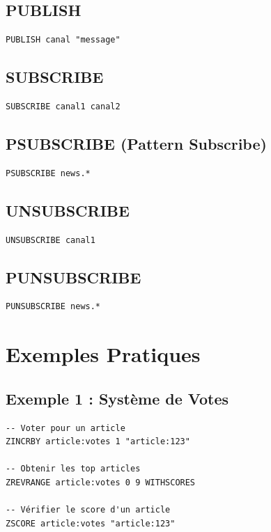 \documentclass[11pt,a4paper]{article}
\begin{document}
\subsection{PUBLISH}

\begin{lstlisting}
PUBLISH canal "message"
\end{lstlisting}

\subsection{SUBSCRIBE}

\begin{lstlisting}
SUBSCRIBE canal1 canal2
\end{lstlisting}

\subsection{PSUBSCRIBE (Pattern Subscribe)}

\begin{lstlisting}
PSUBSCRIBE news.*
\end{lstlisting}

\subsection{UNSUBSCRIBE}

\begin{lstlisting}
UNSUBSCRIBE canal1
\end{lstlisting}

\subsection{PUNSUBSCRIBE}

\begin{lstlisting}
PUNSUBSCRIBE news.*
\end{lstlisting}

\newpage

\section{Exemples Pratiques}

\subsection{Exemple 1 : Système de Votes}

\begin{lstlisting}
-- Voter pour un article
ZINCRBY article:votes 1 "article:123"

-- Obtenir les top articles
ZREVRANGE article:votes 0 9 WITHSCORES

-- Vérifier le score d'un article
ZSCORE article:votes "article:123"
\end{lstlisting}
\end{document}
